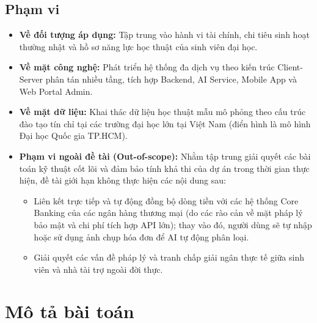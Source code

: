 \subsection{Phạm vi}
\begin{itemize}
    \item \textbf{Về đối tượng áp dụng:} Tập trung vào hành vi tài chính, chi tiêu sinh hoạt thường nhật và hồ sơ năng lực học thuật của sinh viên đại học.
    \item \textbf{Về mặt công nghệ:} Phát triển hệ thống đa dịch vụ theo kiến trúc Client-Server phân tán nhiều tầng, tích hợp Backend, AI Service, Mobile App và Web Portal Admin.
    \item \textbf{Về mặt dữ liệu:} Khai thác dữ liệu học thuật mẫu mô phỏng theo cấu trúc đào tạo tín chỉ tại các trường đại học lớn tại Việt Nam (điển hình là mô hình Đại học Quốc gia TP.HCM).
    \item \textbf{Phạm vi ngoài đề tài (Out-of-scope):} Nhằm tập trung giải quyết các bài toán kỹ thuật cốt lõi và đảm bảo tính khả thi của dự án trong thời gian thực hiện, đề tài giới hạn không thực hiện các nội dung sau:
    \begin{itemize}
        \item Liên kết trực tiếp và tự động đồng bộ dòng tiền với các hệ thống Core Banking của các ngân hàng thương mại (do các rào cản về mặt pháp lý bảo mật và chi phí tích hợp API lớn); thay vào đó, người dùng sẽ tự nhập hoặc sử dụng ảnh chụp hóa đơn để AI tự động phân loại.
        \item Giải quyết các vấn đề pháp lý và tranh chấp giải ngân thực tế giữa sinh viên và nhà tài trợ ngoài đời thực.
    \end{itemize}
\end{itemize}

\section{Mô tả bài toán}
